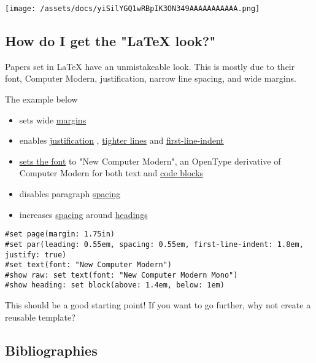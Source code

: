 \texttt{[image: /assets/docs/yiSilYGQ1wRBpIK3ON349AAAAAAAAAAA.png]}

\subsection{How do I get the "LaTeX look?"}\label{latex-look}

Papers set in LaTeX have an unmistakeable look. This is mostly due to
their font, Computer Modern, justification, narrow line spacing, and
wide margins.

The example below

\begin{itemize}
\tightlist
\item
  sets wide
  \href{/docs/reference/layout/page/\#parameters-margin}{margins}
\item
  enables
  \href{/docs/reference/model/par/\#parameters-justify}{justification} ,
  \href{/docs/reference/model/par/\#parameters-leading}{tighter lines}
  and
  \href{/docs/reference/model/par/\#parameters-first-line-indent}{first-line-indent}
\item
  \href{/docs/reference/text/text/\#parameters-font}{sets the font} to
  "New Computer Modern", an OpenType derivative of Computer Modern for
  both text and \href{/docs/reference/text/raw/}{code blocks}
\item
  disables paragraph
  \href{/docs/reference/layout/block/\#parameters-spacing}{spacing}
\item
  increases
  \href{/docs/reference/layout/block/\#parameters-spacing}{spacing}
  around \href{/docs/reference/model/heading/}{headings}
\end{itemize}

\begin{verbatim}
#set page(margin: 1.75in)
#set par(leading: 0.55em, spacing: 0.55em, first-line-indent: 1.8em, justify: true)
#set text(font: "New Computer Modern")
#show raw: set text(font: "New Computer Modern Mono")
#show heading: set block(above: 1.4em, below: 1em)
\end{verbatim}

This should be a good starting point! If you want to go further, why not
create a reusable template?

\subsection{Bibliographies}\label{bibliographies}

